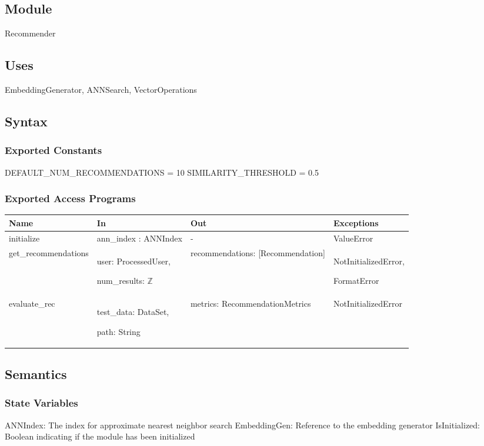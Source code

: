 \documentclass[12pt, titlepage]{article}
\begin{document}
\subsection{Module}

Recommender

\subsection{Uses}
EmbeddingGenerator, ANNSearch, VectorOperations

\subsection{Syntax}

\subsubsection{Exported Constants}
DEFAULT\_NUM\_RECOMMENDATIONS = 10
SIMILARITY\_THRESHOLD = 0.5
\subsubsection{Exported Access Programs}

\begin{center}
\begin{tabular}{p{4cm} p{4cm} p{4cm} p{3cm}}
\hline
\textbf{Name} & \textbf{In} & \textbf{Out} & \textbf{Exceptions} \\
\hline
initialize & ann\_index : ANNIndex& -& ValueError \\
\hline
get\_recommendations & user: ProcessedUser,

num\_results: $\mathbb{Z}$ & recommendations: [Recommendation] & NotInitializedError,

FormatError \\
\hline
evaluate\_rec & test\_data: DataSet,

path: String & metrics: RecommendationMetrics & NotInitializedError \\
\hline
\end{tabular}
\end{center}

\subsection{Semantics}

\subsubsection{State Variables}
ANNIndex: The index for approximate nearest neighbor search
EmbeddingGen: Reference to the embedding generator
IsInitialized: Boolean indicating if the module has been initialized
\end{document}
